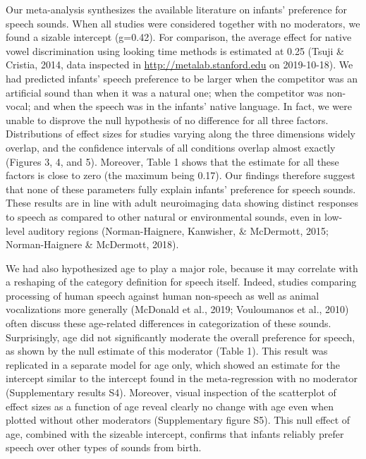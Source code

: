 \documentclass[man]{apa6}
\begin{document}
Our meta-analysis synthesizes the available literature on infants' preference for speech sounds. When all studies were considered together with no moderators, we found a sizable intercept (g=0.42). For comparison, the average effect for native vowel discrimination using looking time methods is estimated at 0.25 (Tsuji \& Cristia, 2014, data inspected in \url{http://metalab.stanford.edu} on 2019-10-18). We had predicted infants' speech preference to be larger when the competitor was an artificial sound than when it was a natural one; when the competitor was non-vocal; and when the speech was in the infants' native language. In fact, we were unable to disprove the null hypothesis of no difference for all three factors. Distributions of effect sizes for studies varying along the three dimensions widely overlap, and the confidence intervals of all conditions overlap almost exactly (Figures 3, 4, and 5). Moreover, Table 1 shows that the estimate for all these factors is close to zero (the maximum being 0.17). Our findings therefore suggest that none of these parameters fully explain infants' preference for speech sounds. These results are in line with adult neuroimaging data showing distinct responses to speech as compared to other natural or environmental sounds, even in low-level auditory regions (Norman-Haignere, Kanwisher, \& McDermott, 2015; Norman-Haignere \& McDermott, 2018).

We had also hypothesized age to play a major role, because it may correlate with a reshaping of the category definition for speech itself. Indeed, studies comparing processing of human speech against human non-speech as well as animal vocalizations more generally (McDonald et al., 2019; Vouloumanos et al., 2010) often discuss these age-related differences in categorization of these sounds. Surprisingly, age did not significantly moderate the overall preference for speech, as shown by the null estimate of this moderator (Table 1). This result was replicated in a separate model for age only, which showed an estimate for the intercept similar to the intercept found in the meta-regression with no moderator (Supplementary results S4). Moreover, visual inspection of the scatterplot of effect sizes as a function of age reveal clearly no change with age even when plotted without other moderators (Supplementary figure S5). This null effect of age, combined with the sizeable intercept, confirms that infants reliably prefer speech over other types of sounds from birth.
\end{document}
